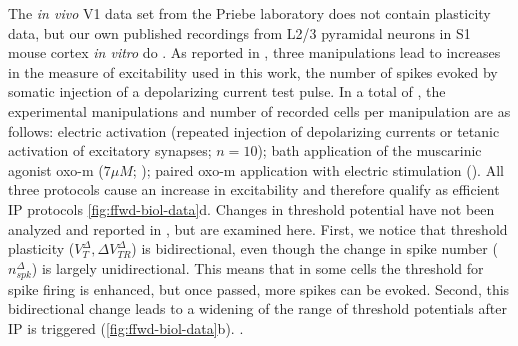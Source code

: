 The \textit{in vivo} V1 data set \citep{Li2020-ej} from the Priebe laboratory does not contain plasticity data,
        but our own published recordings from L2/3 pyramidal neurons in S1 mouse cortex \textit{in vitro} do \citep{Gill2020-wy}.
    As reported in \cite{Gill2020-wy},
        three manipulations lead to increases in the measure of excitability used in this work,
        the number of spikes evoked by somatic injection of a depolarizing current test pulse.
    In a total of
        ,
        the experimental manipulations and number of recorded cells per manipulation are as follows:
        electric activation (repeated injection of depolarizing currents or tetanic activation of excitatory synapses; $n=10$);
        bath application of the muscarinic agonist oxo-m ($7 \mu M$; );
        paired oxo-m application with electric stimulation ().
    All three protocols cause an increase in excitability \citep{Gill2020-wy}
        and therefore qualify as efficient IP protocols \autoref{fig:ffwd-biol-data}d.
    Changes in threshold potential have not been analyzed and reported in \cite{Gill2020-wy},
        but are examined here.
    First, we notice that threshold plasticity ($V_T^{\Delta}, \Delta V_{TR}^{\Delta}$) is bidirectional,
        even though the change in spike number ($n_{spk}^{\Delta}$) is largely unidirectional.
    This means that in some cells the threshold for spike firing is enhanced,
        but once passed, more spikes can be evoked.
    Second, this bidirectional change leads to a widening of the range of threshold potentials
        after IP is triggered (\autoref{fig:ffwd-biol-data}b).
    .

